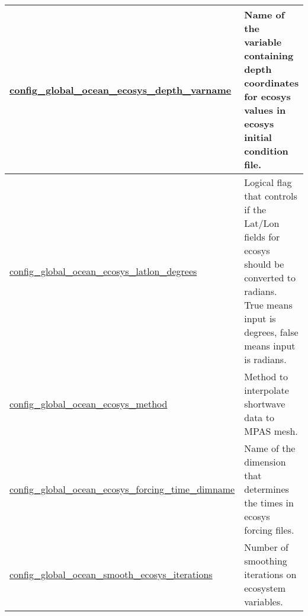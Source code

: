{\begin{center}
\begin{longtable}{| p{2.0in} || p{4.0in} |}
    \hline
    \hyperref[subsec:nm_sec_config_global_ocean_ecosys_depth_varname]{config\_global\_ocean\_ecosys\_\-depth\_varname} & Name of the variable containing depth coordinates for ecosys values in ecosys initial condition file. \\
    \hline
    \hyperref[subsec:nm_sec_config_global_ocean_ecosys_latlon_degrees]{config\_global\_ocean\_ecosys\_\-latlon\_degrees} & Logical flag that controls if the Lat/Lon fields for ecosys should be converted to radians. True means input is degrees, false means input is radians. \\
    \hline
    \hyperref[subsec:nm_sec_config_global_ocean_ecosys_method]{config\_global\_ocean\_ecosys\_\-method} & Method to interpolate shortwave data to MPAS mesh. \\
    \hline
    \hyperref[subsec:nm_sec_config_global_ocean_ecosys_forcing_time_dimname]{config\_global\_ocean\_ecosys\_\-forcing\_time\_dimname} & Name of the dimension that determines the times in ecosys forcing files. \\
    \hline
    \hyperref[subsec:nm_sec_config_global_ocean_smooth_ecosys_iterations]{config\_global\_ocean\_smooth\_\-ecosys\_iterations} & Number of smoothing iterations on ecosystem variables. \\
    \hline
\end{longtable}
\end{center}
}
